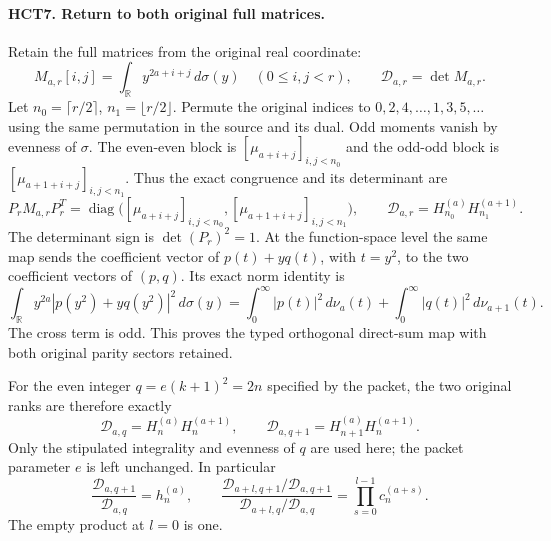 \documentclass[11pt,a4paper]{article}
\begin{document}
\paragraph{HCT7. Return to both original full matrices.}
Retain the full matrices from the original real coordinate:
\begin{equation}\tag{HCT31}
 M_{a,r}[i,j]=\int_{\mathbb R}y^{2a+i+j}\,d\sigma(y)
 \quad(0\leq i,j<r),\qquad \mathcal D_{a,r}=\det M_{a,r}.
\end{equation}
Let $n_0=\lceil r/2\rceil$, $n_1=\lfloor r/2\rfloor$.
Permute the original indices to $0,2,4,\ldots,1,3,5,\ldots$
using the same permutation in the source and its dual. Odd
moments vanish by evenness of $\sigma$. The even-even block is
$[\mu_{a+i+j}]_{i,j<n_0}$ and the odd-odd block is
$[\mu_{a+1+i+j}]_{i,j<n_1}$. Thus the exact congruence and
its determinant are
\begin{equation}\tag{HCT32}
 P_r M_{a,r}P_r^T=
 \operatorname{diag}\big([\mu_{a+i+j}]_{i,j<n_0},
 [\mu_{a+1+i+j}]_{i,j<n_1}\big),\qquad
 \mathcal D_{a,r}=H_{n_0}^{(a)}H_{n_1}^{(a+1)}.
\end{equation}
The determinant sign is $\det(P_r)^2=1$.
At the function-space level the same map sends the coefficient
vector of $p(t)+yq(t)$, with $t=y^2$, to the two coefficient
vectors of $(p,q)$. Its exact norm identity is
\[
 \int_{\mathbb R}y^{2a}|p(y^2)+yq(y^2)|^2\,d\sigma(y)
 =\int_0^\infty|p(t)|^2\,d\nu_a(t)
  +\int_0^\infty|q(t)|^2\,d\nu_{a+1}(t).
\]
The cross term is odd. This proves the typed orthogonal direct-sum
map with both original parity sectors retained.

For the even integer $q=e(k+1)^2=2n$ specified by the packet,
the two original ranks are therefore exactly
\begin{equation}\tag{HCT33}
 \mathcal D_{a,q}=H_n^{(a)}H_n^{(a+1)},\qquad
 \mathcal D_{a,q+1}=H_{n+1}^{(a)}H_n^{(a+1)}.
\end{equation}
Only the stipulated integrality and evenness of $q$ are used here;
the packet parameter $e$ is left unchanged.
In particular
\begin{equation}\tag{HCT34}
 \frac{\mathcal D_{a,q+1}}{\mathcal D_{a,q}}=h_n^{(a)},\qquad
 \frac{\mathcal D_{a+l,q+1}/\mathcal D_{a,q+1}}
 {\mathcal D_{a+l,q}/\mathcal D_{a,q}}
 =\prod_{s=0}^{l-1}c_n^{(a+s)}.
\end{equation}
The empty product at $l=0$ is one.
\end{document}
